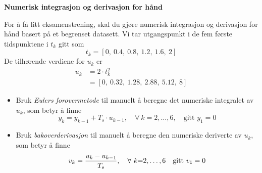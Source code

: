 \item
{\bf Numerisk integrasjon og derivasjon for hånd}
\label{oppg:c}

For å få litt eksamenstrening, skal du gjøre numerisk integrasjon og
  derivasjon for hånd basert på et begrenset datasett. 
  Vi tar utgangspunkt i de fem første tidspunktene i $t_{k}$ gitt som
  \begin{equation}
    \label{eq:2}
  t_{k}=[0,~0.4,~0.8,~1.2,~1.6,~2]    
  \end{equation}
De tilhørende  verdiene for  $u_{k}$ er 
  \begin{align}
    \label{eq:1g}
    u_{k} &= 2{\cdot} t_{k}^{2} \\
    & = [0,~    0.32,~    1.28,~    2.88,~    5.12, ~8] 
  \end{align}

  \begin{itemize}
  \item 
  Bruk {\it Eulers forovermetode} 
  til manuelt å beregne det numeriske integralet av
  $u_{k}$, som betyr å finne 
  \begin{equation}
    \label{eq:1}
    y_{k}  =  y_{k-1} +  T_s {\cdot} u_{k-1}, 
    \quad \forall~ k=2,\ldots ,6, \quad \text{gitt } y_{1}=0
  \end{equation}
  
  \item 
  Bruk {\it bakoverderivasjon} til
  manuelt å beregne den numeriske deriverte av $u_{k}$, som betyr å finne
  \begin{equation}
     v_{k} =\frac{u_{k}-u_{k-1}}{T_s}, \quad  \forall ~
            k{=}2,\ldots,6 \quad \text{gitt } v_{1}=0 \\
  \end{equation}
  \end{itemize}
